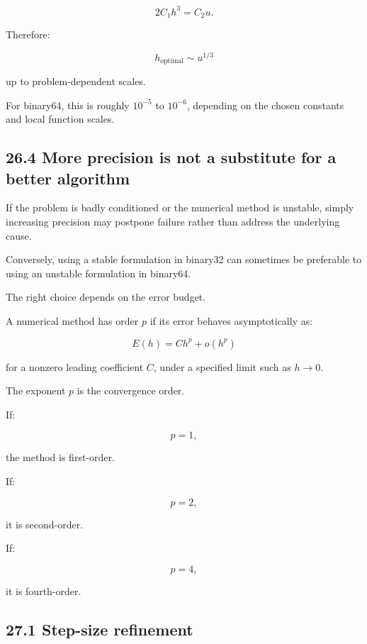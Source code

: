 \[ 2C_1h^3=C_2u. \]

Therefore:

\[ \boxed{ h_{\mathrm{optimal}}\sim u^{1/3} } \]

up to problem-dependent scales.

For binary64, this is roughly \(10^{-5}\) to \(10^{-6}\), depending on the chosen constants and local function scales.

\subsection{26.4 More precision is not a substitute for a better algorithm}\label{02-foundations-ii-ch029-more-precision-is-not-a-substitute-for-a-better-algorithm}

\hypertarget{02-foundations-ii-ch029-more-precision-is-not-a-substitute-for-a-better-algorithm}{}

If the problem is badly conditioned or the numerical method is unstable, simply increasing precision may postpone failure rather than address the underlying cause.

Conversely, using a stable formulation in binary32 can sometimes be preferable to using an unstable formulation in binary64.

The right choice depends on the error budget.

A numerical method has order \(p\) if its error behaves asymptotically as:

\[ \boxed{ E(h)=Ch^p+o(h^p) } \]

for a nonzero leading coefficient \(C\), under a specified limit such as \(h\to0\).

The exponent \(p\) is the convergence order.

If:

\[ p=1, \]

the method is first-order.

If:

\[ p=2, \]

it is second-order.

If:

\[ p=4, \]

it is fourth-order.

\subsection{27.1 Step-size refinement}\label{02-foundations-ii-ch029-step-size-refinement}

\hypertarget{02-foundations-ii-ch029-step-size-refinement}{}

